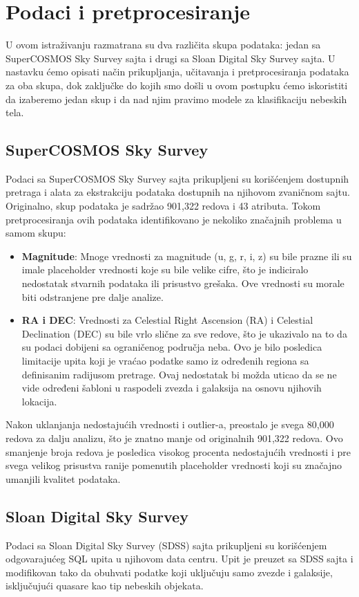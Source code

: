 \documentclass[a4paper,12pt]{article}
\begin{document}
\section{Podaci i pretprocesiranje}
U ovom istraživanju razmatrana su dva različita skupa podataka: jedan sa SuperCOSMOS Sky Survey sajta i drugi sa Sloan Digital Sky Survey sajta. U nastavku ćemo opisati način prikupljanja, učitavanja i pretprocesiranja podataka za oba skupa, dok zaključke do kojih smo došli u ovom postupku ćemo iskoristiti da izaberemo jedan skup i da nad njim pravimo modele za klasifikaciju nebeskih tela.

\subsection{SuperCOSMOS Sky Survey}
Podaci sa SuperCOSMOS Sky Survey sajta prikupljeni su korišćenjem dostupnih pretraga i alata za ekstrakciju podataka dostupnih na njihovom zvaničnom sajtu. Originalno, skup podataka je sadržao 901,322 redova i 43 atributa.
Tokom pretprocesiranja ovih podataka identifikovano je nekoliko značajnih problema u samom skupu:
\begin{itemize}
    \item \textbf{Magnitude}: Mnoge vrednosti za magnitude (u, g, r, i, z) su bile prazne ili su imale placeholder vrednosti koje su bile velike cifre, što je indiciralo nedostatak stvarnih podataka ili prisustvo grešaka. Ove vrednosti su morale biti odstranjene pre dalje analize.
    \item \textbf{RA i DEC}: Vrednosti za Celestial Right Ascension (RA) i Celestial Declination (DEC) su bile vrlo slične za sve redove, što je ukazivalo na to da su podaci dobijeni sa ograničenog područja neba. Ovo je bilo posledica limitacije upita  koji je vraćao podatke samo iz određenih regiona sa definisanim radijusom pretrage. Ovaj nedostatak bi možda uticao da se ne vide određeni šabloni u raspodeli zvezda i galaksija na osnovu njihovih lokacija.
\end{itemize}

Nakon uklanjanja nedostajućih vrednosti i outlier-a, preostalo je svega 80,000 redova za dalju analizu, što je znatno manje od originalnih 901,322 redova. Ovo smanjenje broja redova je posledica visokog procenta nedostajućih vrednosti i pre svega velikog prisustva ranije pomenutih placeholder vrednosti  koji su značajno umanjili kvalitet podataka.

\subsection{Sloan Digital Sky Survey}
Podaci sa Sloan Digital Sky Survey (SDSS) sajta prikupljeni su korišćenjem odgovarajućeg SQL upita u njihovom data centru. Upit je preuzet sa SDSS sajta i modifikovan tako da obuhvati podatke koji uključuju samo zvezde i galaksije, isključujući quasare kao tip nebeskih objekata.
\end{document}
